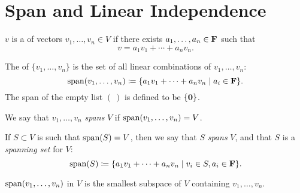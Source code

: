 \section{Span and Linear Independence}
\begin{definition}
$v$ is a  of vectors $v_1,\dots,v_n\in V$ if there exists $a_1,\dots,a_n\in\mathbf F$ such that
\[v=a_1v_1+\cdots+a_nv_n.\]
\end{definition}

\begin{definition}[Span]
The  of $\{v_1,\dots,v_n\}$ is the set of all linear combinations of $v_1,\dots,v_n$:
\[\operatorname{span}(v_1,\dots,v_n)\coloneqq\{a_1v_1+\cdots+a_nv_n\mid a_i\in\mathbf F\}.\]
The span of the empty list $(\:)$ is defined to be $\{\vb{0}\}$.

We say that $v_1,\dots,v_n$ \emph{spans} $V$ if $\operatorname{span}(v_1,\dots,v_n)=V$.

If $S\subset V$ is such that $\operatorname{span}(S)=V$, then we say that $S$ \emph{spans} $V$, and that $S$ is a \emph{spanning set} for $V$:
\[\operatorname{span}(S)\coloneqq\{a_1v_1+\cdots+a_nv_n\mid v_i\in S, a_i\in\mathbf F\}.\]
\end{definition}

\begin{proposition}
$\operatorname{span}(v_1,\dots,v_n)$ in $V$ is the smallest subspace of $V$ containing $v_1,\dots,v_n$.
\end{proposition}

